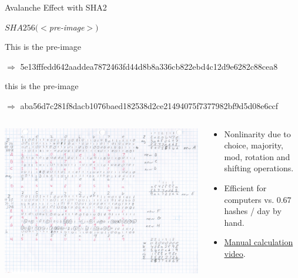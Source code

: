\documentclass[handout]{beamer}
\begin{document}
\begin{frame}{Avalanche Effect with SHA2}

\begin{center}
$SHA256(<$\textit{pre-image}$>)$
\end{center}

This is the pre-image

$\Rightarrow$ \footnotesize 5e13fffedd642aaddea7872463fd44d8b8a336cb822ebd4c12d9e6282c88cea8 \normalsize
\vspace{1em}

\color{focus}t\color{black}his is the pre-image

$\Rightarrow$ \footnotesize \color{focus}aba56d7c281f8d\color{black}a\color{focus}cb1076baed182538d2ce21494075f7377982bf9d5d0\color{black}8\color{focus}e6ccf\color{black} \normalsize
\vspace{1em}

\begin{columns}[T]
	\begin{column}{0.35\textwidth}
		\includegraphics[width = 4 cm, frame]{../assets/images/manual_hashing_video.png}
	\end{column} %
	\begin{column}{0.65\textwidth}
		\begin{itemize}
			\item Nonlinarity due to choice, majority, mod, rotation and shifting operations.
			\item Efficient for computers vs. 0.67 hashes / day by hand.
			\item \link \href{https://www.youtube.com/watch?v=y3dqhixzGVo}{Manual calculation video}.
		\end{itemize}
	\end{column}
\end{columns}

	
\end{frame}
\end{document}
